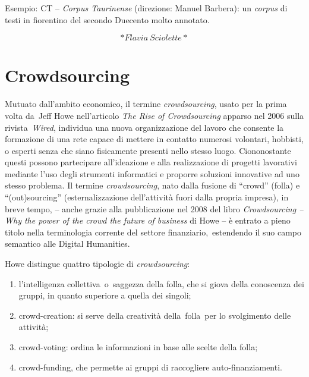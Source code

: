 \documentclass[
  b5paper,
  twoside,
  12pt,
  chapterprefix=false,
  bibliography=totocnumbered,
  parskip=false]{scrbook}
\begin{document}
Esempio: CT -- \emph{Corpus Taurinense} (direzione: Manuel Barbera): un
\emph{corpus} di testi in fiorentino del secondo Duecento molto annotato.

\[*Flavia~Sciolette*\]

\hypertarget{crowdsourcing}{%
\chapter{Crowdsourcing}\label{crowdsourcing}}

Mutuato dall'ambito economico, il termine \emph{crowdsourcing}, usato per la
prima volta da~Jeff Howe nell'articolo \emph{The Rise of Crowdsourcing}
apparso nel 2006 sulla rivista~\emph{Wired}, individua una nuova
organizzazione del lavoro che consente la formazione di una rete capace
di mettere in contatto numerosi volontari, hobbisti, o esperti senza che
siano fisicamente presenti nello stesso luogo. Ciononostante questi
possono partecipare all'ideazione e alla realizzazione di progetti
lavorativi mediante l'uso degli strumenti informatici e proporre
soluzioni innovative ad uno stesso problema. Il termine \emph{crowdsourcing},
nato dalla fusione di \enquote{crowd} (folla) e \enquote{(out)sourcing}
(esternalizzazione dell'attività fuori dalla propria impresa), in breve
tempo, -- anche grazie alla pubblicazione nel 2008 del libro
\emph{Crowdsourcing -- Why the power of the crowd the future of business} di
Howe -- è entrato a pieno titolo nella terminologia corrente del settore
finanziario,~estendendo il suo campo semantico alle Digital Humanities.

Howe distingue quattro tipologie di \emph{crowdsourcing}:

\begin{enumerate}
\def\labelenumi{\arabic{enumi}.}
\item
  l'intelligenza collettiva~o~saggezza della folla, che si giova della
  conoscenza dei gruppi, in quanto superiore a quella dei singoli;
\item
  crowd-creation: si serve della creatività della~folla~per lo
  svolgimento delle attività;
\item
  crowd-voting: ordina le informazioni in base alle scelte della
  folla;
\item
  crowd-funding, che permette ai gruppi di raccogliere
  auto-finanziamenti.
\end{enumerate}
\end{document}
